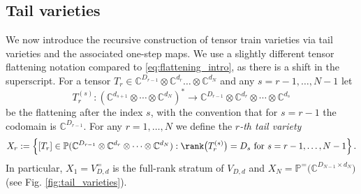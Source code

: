 \documentclass{article}
\theoremstyle{definition}
\newcommand{\C}{\mathbb{C}}
\renewcommand{\P}{\mathbb{P}}
\begin{document}
\subsection*{Tail varieties}

We now introduce the recursive construction of tensor train varieties via tail varieties and the associated one-step maps. We use a slightly different tensor flattening notation compared to \eqref{eq:flattening_intro}, as there is a shift in the superscript. For a tensor $T_r \in \C^{D_{r-1}} \otimes \C^{d_r}\dots \otimes \C^{d_N}$ and any $s=r-1,\dots,N-1$ let
\[
T_r^{(s)}:\left(\C^{d_{s+1}}\otimes\cdots\otimes \C^{d_N}\right)^*
\longrightarrow 
\C^{D_{r-1}}\otimes
\C^{d_r}\otimes\cdots\otimes
\C^{d_s}
\]
be the flattening after the index $s$, with the convention that for $s=r-1$ the codomain is $\C^{D_{r-1}}$. For any $r=1,\dots,N$ we define the \emph{$r$-th tail variety} 
\[
X_r
:=
\left\{
[T_r]\in \P(\C^{D_{r-1}}\otimes
\C^{d_r}\otimes\cdots\otimes
\C^{d_N}):
\rank\bigl(T_r^{(s)}\bigr)=D_s
\text{ for } s=r-1,\dots,N-1
\right\}.
\]
In particular, $X_1=V^{=}_{D,d}$ is the full-rank stratum of $V_{D,d}$ and $X_N=\P^{=}\!\bigl(\C^{D_{N-1}\times d_N}\bigr)$ (see Fig. \ref{fig:tail_varieties}).
\end{document}
